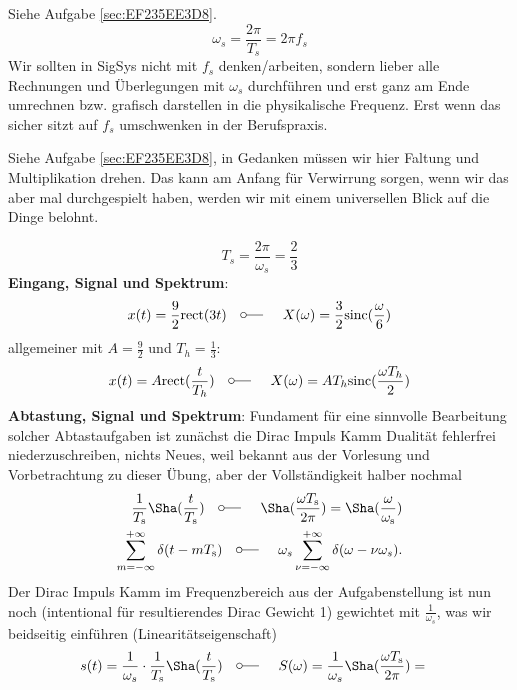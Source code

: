 \begin{Werkzeug}
Siehe Aufgabe \ref{sec:EF235EE3D8}.
$$\omega_s = \frac{2\pi}{T_s} = 2 \pi f_s$$
Wir sollten in SigSys nicht mit $f_s$ denken/arbeiten, sondern lieber alle Rechnungen und Überlegungen
mit $\omega_s$ durchführen und erst ganz am Ende umrechnen bzw. grafisch darstellen in die physikalische Frequenz.
Erst wenn das sicher sitzt auf $f_s$ umschwenken in der Berufspraxis.
\end{Werkzeug}
\begin{Ansatz}
Siehe Aufgabe \ref{sec:EF235EE3D8}, in Gedanken müssen wir hier Faltung und
Multiplikation drehen. Das kann am Anfang für Verwirrung sorgen, wenn wir das
aber mal durchgespielt haben, werden wir mit einem
universellen Blick auf die Dinge belohnt.
\end{Ansatz}
\begin{ExCalc}
$$T_s = \frac{2\pi}{\omega_s} = \frac{2}{3}$$
\textbf{Eingang, Signal und Spektrum}:
\begin{align}
x(t) = \frac{9}{2} \mathrm{rect}(3 t)
\quad\fourier\quad
X(\omega) = \frac{3}{2}\mathrm{sinc}(\frac{\omega}{6})
\end{align}
allgemeiner mit $A = \frac{9}{2}$ und $T_h=\frac{1}{3}$:
\begin{align}
x(t) = A \mathrm{rect}(\frac{t}{T_h})
\quad\fourier\quad
X(\omega) = A T_h\mathrm{sinc}(\frac{\omega T_h}{2})
\end{align}
%
\textbf{Abtastung, Signal und Spektrum}:
Fundament für eine sinnvolle Bearbeitung solcher Abtastaufgaben ist zunächst die
Dirac Impuls Kamm Dualität fehlerfrei niederzuschreiben, nichts Neues, weil bekannt aus
der Vorlesung und Vorbetrachtung zu dieser Übung, aber der Vollständigkeit halber nochmal
\begin{align}
\frac{1}{T_\mathrm{s}} {\Sha}(\frac{t}{T_\mathrm{s}}) \quad\fourier\quad
{\Sha}(\frac{\omega T_\mathrm{s}}{2 \pi}) =
\Sha(\frac{\omega}{\omega_\mathrm{s}})\\
\sum_{m=-\infty}^{+\infty} \delta(t-m T_\mathrm{s}) \quad\fourier\quad
\omega_s \sum_{\nu=-\infty}^{+\infty} \delta(\omega-\nu \omega_s).
\end{align}
%
Der Dirac Impuls Kamm im Frequenzbereich aus der Aufgabenstellung ist nun noch
(intentional für resultierendes Dirac Gewicht 1) gewichtet mit $\frac{1}{\omega_s}$,
was wir beidseitig einführen (Linearitätseigenschaft)
\begin{align}
s(t) = \frac{1}{\omega_s}\cdot\frac{1}{T_\mathrm{s}} {\Sha}(\frac{t}{T_\mathrm{s}}) &\quad\fourier\quad
S(\omega) = \frac{1}{\omega_s} {\Sha}(\frac{\omega T_\mathrm{s}}{2 \pi}) =

\end{align}
\end{ExCalc}
